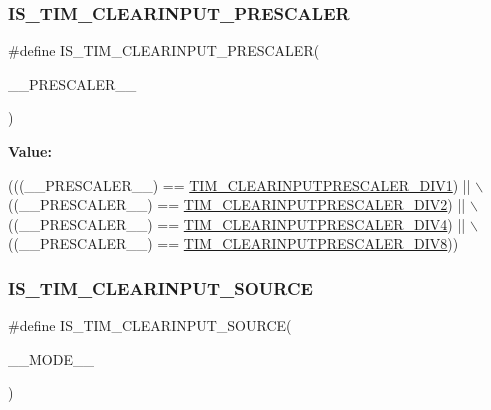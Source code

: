 \subsubsection{\texorpdfstring{I\+S\+\_\+\+T\+I\+M\+\_\+\+C\+L\+E\+A\+R\+I\+N\+P\+U\+T\+\_\+\+P\+R\+E\+S\+C\+A\+L\+ER}{IS\_TIM\_CLEARINPUT\_PRESCALER}}
{\footnotesize\ttfamily \#define I\+S\+\_\+\+T\+I\+M\+\_\+\+C\+L\+E\+A\+R\+I\+N\+P\+U\+T\+\_\+\+P\+R\+E\+S\+C\+A\+L\+ER(\begin{DoxyParamCaption}\item[{}]{\+\_\+\+\_\+\+P\+R\+E\+S\+C\+A\+L\+E\+R\+\_\+\+\_\+ }\end{DoxyParamCaption})}

{\bfseries Value\+:}
\begin{DoxyCode}
(((\_\_PRESCALER\_\_) == \hyperlink{group___t_i_m___clear_input___prescaler_gaf88d719dd5535b6b58275549c4512ec7}{TIM\_CLEARINPUTPRESCALER\_DIV1}) || \(\backslash\)
                                                    ((\_\_PRESCALER\_\_) == 
      \hyperlink{group___t_i_m___clear_input___prescaler_gae54b2f4ea04ef97f7c75755347edc8ba}{TIM\_CLEARINPUTPRESCALER\_DIV2}) || \(\backslash\)
                                                    ((\_\_PRESCALER\_\_) == 
      \hyperlink{group___t_i_m___clear_input___prescaler_gae3c3dea810bb9d83b532737f01a3213d}{TIM\_CLEARINPUTPRESCALER\_DIV4}) || \(\backslash\)
                                                    ((\_\_PRESCALER\_\_) == 
      \hyperlink{group___t_i_m___clear_input___prescaler_ga34bc6cb7ee8800cc48b1ee6c536859cc}{TIM\_CLEARINPUTPRESCALER\_DIV8}))
\end{DoxyCode}
\mbox{\label{group___t_i_m___private___macros_ga2bfb55166b01cec552638c1af05a5c54}} 
\subsubsection{\texorpdfstring{I\+S\+\_\+\+T\+I\+M\+\_\+\+C\+L\+E\+A\+R\+I\+N\+P\+U\+T\+\_\+\+S\+O\+U\+R\+CE}{IS\_TIM\_CLEARINPUT\_SOURCE}}
{\footnotesize\ttfamily \#define I\+S\+\_\+\+T\+I\+M\+\_\+\+C\+L\+E\+A\+R\+I\+N\+P\+U\+T\+\_\+\+S\+O\+U\+R\+CE(\begin{DoxyParamCaption}\item[{}]{\+\_\+\+\_\+\+M\+O\+D\+E\+\_\+\+\_\+ }\end{DoxyParamCaption})}

